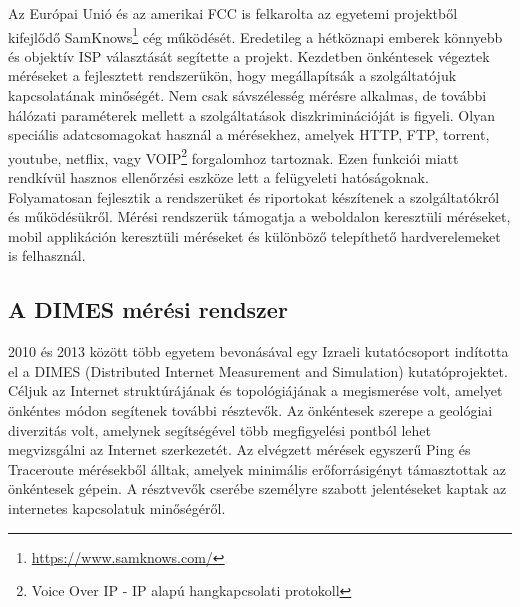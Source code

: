 Az Európai Unió és az amerikai FCC is felkarolta az egyetemi projektből kifejlődő SamKnows\footnote{\url{https://www.samknows.com/}} cég működését. Eredetileg a hétköznapi emberek könnyebb és objektív ISP választását segítette a projekt. Kezdetben önkéntesek végeztek méréseket a fejlesztett rendszerükön, hogy megállapítsák a szolgáltatójuk kapcsolatának minőségét. Nem csak sávszélesség mérésre alkalmas, de további hálózati paraméterek mellett a szolgáltatások diszkriminációját is figyeli. Olyan speciális adatcsomagokat használ a mérésekhez, amelyek HTTP, FTP, torrent, youtube, netflix, vagy VOIP\footnote{Voice Over IP - IP alapú hangkapcsolati protokoll} forgalomhoz tartoznak. Ezen funkciói miatt rendkívül hasznos ellenőrzési eszköze lett a felügyeleti hatóságoknak. Folyamatosan fejlesztik a rendszerüket és riportokat készítenek a szolgáltatókról és működésükről.
Mérési rendszerük támogatja a weboldalon keresztüli méréseket, mobil applikáción keresztüli méréseket és különböző telepíthető hardverelemeket is felhasznál.


\subsection{A DIMES mérési rendszer}

2010 és 2013 között több egyetem bevonásával egy Izraeli kutatócsoport indította el a DIMES (Distributed Internet Measurement and Simulation) kutatóprojektet. Céljuk az Internet struktúrájának és topológiájának a megismerése volt, amelyet önkéntes módon segítenek további résztevők.
Az önkéntesek szerepe a geológiai diverzitás volt, amelynek segítségével több megfigyelési pontból lehet megvizsgálni az Internet szerkezetét.
Az elvégzett mérések egyszerű Ping és Traceroute mérésekből álltak, amelyek minimális erőforrásigényt támasztottak az önkéntesek gépein. A résztvevők cserébe személyre szabott jelentéseket kaptak az internetes kapcsolatuk minőségéről.

